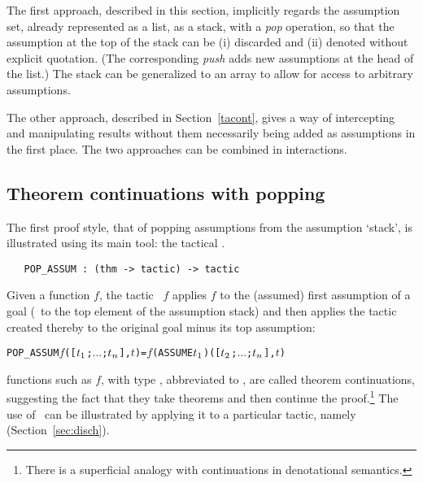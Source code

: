 The first
approach, described in this section, implicitly regards the assumption
set, already represented as a list, as a stack, with a {\it pop\/}
operation, so that the assumption at the top of the stack can be (i) discarded
and (ii) denoted without explicit quotation.  (The corresponding {\it push\/}
adds new assumptions at the head of the list.)
The stack can be generalized to an array to allow for access to
arbitrary assumptions.

The other approach, described in Section~\ref{tacont},
gives a way of intercepting and manipulating results without them necessarily
being added as assumptions in the first place.  The two approaches can
be combined in \HOL{} interactions.


\subsection{Theorem continuations with popping}

The first proof style, that of popping assumptions
from the assumption `stack',
%
%
is illustrated using its main tool: the tactical .

\begin{holboxed}\begin{verbatim}
   POP_ASSUM : (thm -> tactic) -> tactic
\end{verbatim}\end{holboxed}

\noindent Given a function $f$, the tactic
\ $f$ applies $f$ to the (assumed) first
assumption of a goal (\ie\ to the top element of the assumption stack)
and then applies the tactic created thereby to the original goal
minus its top assumption:

\begin{hol}\begin{alltt}
   POP_ASSUM \(f\) ([\(t\sb{1}\);\(\ldots\);\(t\sb{n}\)],\(t\)) = \(f\) (ASSUME \(t\sb{1}\)) ([\(t\sb{2}\);\(\ldots\);\(t\sb{n}\)],\(t\))
\end{alltt}\end{hol}

\noindent \ML{} functions such as $f$,
with type , abbreviated to ,
are called theorem continuations,
 suggesting the fact that they
take theorems and then continue the proof.\footnote{There is a superficial analogy
with continuations in denotational semantics.}
The use of \ can be illustrated by applying it
to a particular tactic, namely  (Section~\ref{sec:disch}).

